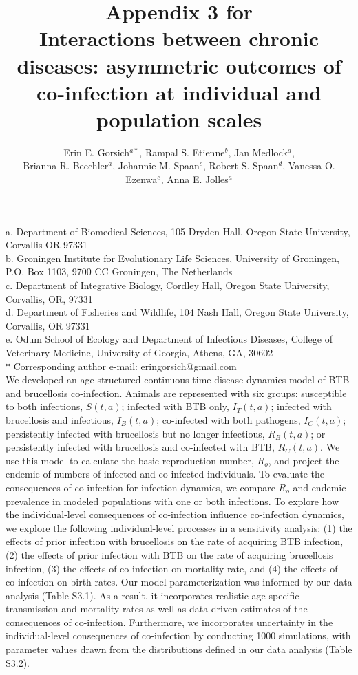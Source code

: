 \documentclass{article}
\title{Appendix 3 for \\
\textbf{Interactions between chronic diseases: asymmetric outcomes of co-infection at individual and population scales}}
\author{Erin E. Gorsich$^{a*}$, Rampal S. Etienne$^{b}$, Jan Medlock$^{a}$, \\ Brianna R. Beechler$^{a}$, Johannie M. Spaan$^{c}$, Robert S. Spaan$^{d}$, Vanessa O. Ezenwa$^{e}$, Anna E. Jolles$^{a}$}
\begin{document}
\maketitle 

\noindent{}a. Department of Biomedical Sciences, 105 Dryden Hall, Oregon State University, Corvallis OR 97331 \\
\noindent{}b. Groningen Institute for Evolutionary Life Sciences, University of Groningen, P.O. Box 1103, 9700 CC Groningen, The Netherlands\\
\noindent{}c. Department of Integrative Biology, Cordley Hall, Oregon State University, Corvallis, OR, 97331 \\
\noindent{}d. Department of Fisheries and Wildlife, 104 Nash Hall, Oregon State University, Corvallis, OR 97331 \\
\noindent{}e. Odum School of Ecology and Department of Infectious Diseases, College of Veterinary Medicine, University of Georgia, Athens, GA, 30602 \\

\noindent{}$\ast$ Corresponding author e-mail: eringorsich@gmail.com \\


We developed an age-structured continuous time disease dynamics model of BTB and brucellosis co-infection. 
Animals are represented with six groups: susceptible to both infections, $S(t, a)$; infected with BTB only, $I_T (t, a)$; infected with brucellosis and infectious, $I_B (t, a)$; co-infected with both pathogens, $I_C (t, a)$; persistently infected with brucellosis but no longer infectious, $R_B (t,a)$; or persistently infected with brucellosis and co-infected with BTB, $R_C (t, a)$. 
We use this model to calculate the basic reproduction number, $R_o$, and project the endemic of numbers of infected and co-infected individuals.
To evaluate the consequences of co-infection for infection dynamics, we compare $R_o$ and endemic prevalence in modeled populations with one or both infections.
To explore how the individual-level consequences of co-infection influence co-infection dynamics, we explore the following individual-level processes in a sensitivity analysis: (1) the effects of prior infection with brucellosis on the rate of acquiring BTB infection, (2) the effects of prior infection with BTB on the rate of acquiring brucellosis infection, (3) the effects of co-infection on mortality rate, and (4) the effects of co-infection on birth rates.
Our model parameterization was informed by our data analysis (Table S3.1). 
As a result, it incorporates realistic age-specific transmission and mortality rates as well as data-driven estimates of the consequences of co-infection.
Furthermore, we incorporates uncertainty in the individual-level consequences of co-infection by conducting 1000 simulations, with parameter values drawn from the distributions defined in our data analysis (Table S3.2). \\
\end{document}
